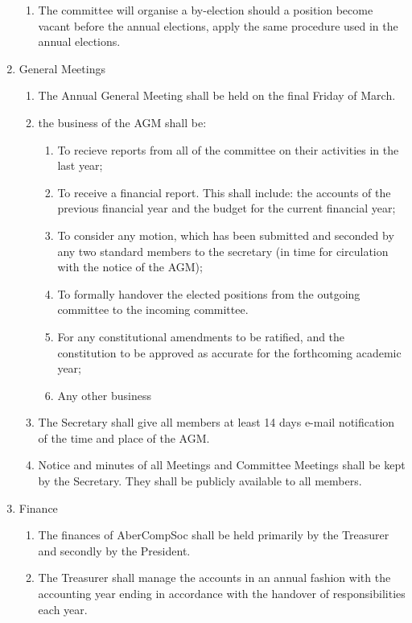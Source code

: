 \documentclass{article}
\begin{document}
\begin{enumerate}
\begin{enumerate}
            \item The committee will organise a by-election should a position become vacant before the annual elections, apply the same procedure used in the annual elections.
        \end{enumerate}
    \item General Meetings
        \begin{enumerate}
            \item The Annual General Meeting shall be held on the final Friday of March.
            \item the business of the AGM shall be:
                \begin{enumerate}
                    \item To recieve reports from all of the committee on their activities in the last year;
                    \item To receive a financial report. This shall include: the accounts of the previous financial year and the budget for the current financial year;
                    \item To consider any motion, which has been submitted and seconded by any two standard members to the secretary (in time for circulation with the notice of the AGM);
                    \item To formally handover the elected positions from the outgoing committee to the incoming committee.
                    \item For any constitutional amendments to be ratified, and the constitution to be approved as accurate for the forthcoming academic year;
                    \item Any other business
                \end{enumerate}
            \item The Secretary shall give all members at least 14 days e-mail notification of the time and place of the AGM.
            \item Notice and minutes of all Meetings and Committee Meetings shall be kept by the Secretary. They shall be publicly available to all members.
        \end{enumerate}
    \item Finance
        \begin{enumerate}
            \item The finances of AberCompSoc shall be held primarily by the Treasurer and secondly by the President.
            \item The Treasurer shall manage the accounts in an annual fashion with the accounting year ending in accordance with the handover of responsibilities each year.

\end{enumerate}
\end{enumerate}
\end{document}
